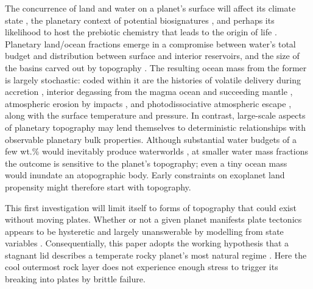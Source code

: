 The concurrence of land and water on a planet's surface will affect its climate state \citep{turbet_habitability_2016, rushby_effect_2019, delgenio_albedos_2019, graham_thermodynamic_2020, zhao_climate_2021}, the planetary context of potential biosignatures \citep{schwieterman_exoplanet_2018, glaser_detectability_2020, lisse_geologically_2020, krissansen-totton_oxygen_2021}, and perhaps its likelihood to host the prebiotic chemistry that leads to the origin of life \citep{patel_common_2015, rimmer_origin_2018, rosas_archaean_2021, vankranendonk_elements_2021}. Planetary land/ocean fractions emerge in a compromise between water's total budget and distribution between surface and interior reservoirs, and the size of the basins carved out by topography \citep[e.g.,][]{simpson_bayesian_2017}. The resulting ocean mass from the former is largely stochastic: coded within it are the histories of volatile delivery during accretion \citep{raymond_highresolution_2006, morbidelli_building_2012}, interior degassing from the magma ocean and succeeding mantle \citep{elkins-tanton_linked_2008, schaefer_redox_2017,  katyal_effect_2020, ortenzi_mantle_2020, guimond_low_2021, barth_magma_2021, lichtenberg_vertically_2021, bower_retention_2021}, atmospheric erosion by impacts \citep{zahnle_cosmic_2017, schlichting_atmosphere_2018, howe_survival_2020}, and photodissociative atmospheric escape \citep{tian_water_2015, zahnle_strange_2019, gronoff_atmospheric_2020}, along with the surface temperature and pressure. In contrast, large-scale aspects of planetary topography may lend themselves to deterministic relationships with observable planetary bulk properties. Although substantial water budgets of a few wt.\% would inevitably produce waterworlds \citep[e.g.,][]{simpson_bayesian_2017}, at smaller water mass fractions the outcome is sensitive to the planet's topography; even a tiny ocean mass would inundate an atopographic body. Early constraints on exoplanet land propensity might therefore start with topography.



This first investigation will limit itself to forms of topography that could exist without moving plates. Whether or not a given planet manifests plate tectonics appears to be hysteretic and largely unanswerable by modelling from state variables \citep{lenardic_notion_2012, weller_evolution_2018, lenardic_diversity_2018}. Consequentially, this paper adopts the working hypothesis that a stagnant lid describes a temperate rocky planet's most natural regime \citep{stern_stagnant_2018}. Here the cool outermost rock layer does not experience enough stress to trigger its breaking into plates by brittle failure.

